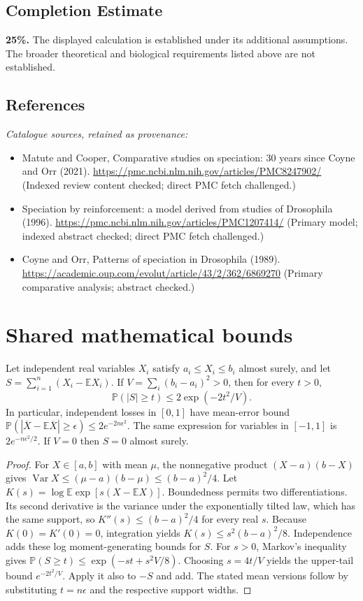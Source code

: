 \documentclass[11pt]{article}
\begin{document}
\subsection{Completion Estimate}
\textbf{25\%.} The displayed calculation is established under its additional assumptions. The broader theoretical and biological requirements listed above are not established.
\subsection{References}
\noindent\emph{Catalogue sources, retained as provenance:}
\begin{itemize}
\item Matute and Cooper, Comparative studies on speciation: 30 years since Coyne and Orr (2021). \url{https://pmc.ncbi.nlm.nih.gov/articles/PMC8247902/} (Indexed review content checked; direct PMC fetch challenged.)
\item Speciation by reinforcement: a model derived from studies of Drosophila (1996). \url{https://pmc.ncbi.nlm.nih.gov/articles/PMC1207414/} (Primary model; indexed abstract checked; direct PMC fetch challenged.)
\item Coyne and Orr, Patterns of speciation in Drosophila (1989). \url{https://academic.oup.com/evolut/article/43/2/362/6869270} (Primary comparative analysis; abstract checked.)
\end{itemize}




\section{Shared mathematical bounds}\label{app:bounds}
\begin{lemma}\label{lem:bounded}
Let independent real variables $X_i$ satisfy $a_i\leq X_i\leq b_i$ almost surely,
and let $S=\sum_{i=1}^n(X_i-\mathbb{E} X_i)$. If
$V=\sum_i(b_i-a_i)^2>0$, then for every $t>0$,
\[
 \mathbb{P}(|S|\geq t)\leq 2\exp(-2t^2/V).
\]
In particular, independent losses in $[0,1]$ have mean-error bound
$\mathbb{P}(|\overline X-\mathbb{E}\overline X|\geq\epsilon)
\leq2e^{-2n\epsilon^2}$. The same expression for variables in $[-1,1]$
is $2e^{-n\epsilon^2/2}$. If $V=0$ then $S=0$ almost surely.
\end{lemma}
\begin{proof}
For $X\in[a,b]$ with mean $\mu$, the nonnegative product
$(X-a)(b-X)$ gives
$\operatorname{Var} X\leq(\mu-a)(b-\mu)\leq(b-a)^2/4$.
Let $K(s)=\log\mathbb{E}\exp[s(X-\mathbb{E} X)]$.
Boundedness permits two differentiations. Its second derivative is the variance
under the exponentially tilted law, which has the same support, so
$K''(s)\leq(b-a)^2/4$ for every real $s$.
Because $K(0)=K'(0)=0$, integration yields
$K(s)\leq s^2(b-a)^2/8$.
Independence adds these log moment-generating bounds for $S$.
For $s>0$, Markov's inequality gives
$\mathbb{P}(S\geq t)\leq\exp(-st+s^2V/8)$.
Choosing $s=4t/V$ yields the upper-tail bound $e^{-2t^2/V}$.
Apply it also to $-S$ and add. The stated mean versions follow by substituting
$t=n\epsilon$ and the respective support widths.
\end{proof}
\end{document}
